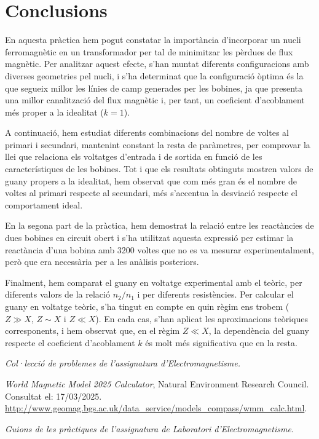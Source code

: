 \documentclass[a4paper,10.5pt]{report}
\begin{document}
\section{Conclusions}
En aquesta pràctica hem pogut constatar la importància d'incorporar un nucli ferromagnètic en un transformador per tal de minimitzar les pèrdues de flux magnètic. Per analitzar aquest efecte, s’han muntat diferents configuracions amb diverses geometries pel nucli, i s’ha determinat que la configuració òptima és la que segueix millor les línies de camp generades per les bobines, ja que presenta una millor canalització del flux magnètic i, per tant, un coeficient d’acoblament més proper a la idealitat ($k = 1$).

A continuació, hem estudiat diferents combinacions del nombre de voltes al primari i secundari, mantenint constant la resta de paràmetres, per comprovar la llei que relaciona els voltatges d'entrada i de sortida en funció de les característiques de les bobines. Tot i que els resultats obtinguts mostren valors de guany propers a la idealitat, hem observat que com més gran és el nombre de voltes al primari respecte al secundari, més s’accentua la desviació respecte el comportament ideal.

En la segona part de la pràctica, hem demostrat la relació entre les reactàncies de dues bobines en circuit obert i s’ha utilitzat aquesta expressió per estimar la reactància d’una bobina amb 3200 voltes que no es va mesurar experimentalment, però que era necessària per a les anàlisis posteriors.

Finalment, hem comparat el guany en voltatge experimental amb el teòric, per diferents valors de la relació $n_2/n_1$ i per diferents resistències. Per calcular el guany en voltatge teòric, s'ha tingut en compte en quin règim ens trobem ($Z \gg X$, $Z \sim X$ i $Z \ll X$). En cada cas, s’han aplicat les aproximacions teòriques corresponents, i hem observat que, en el règim $Z \ll X$, la dependència del guany respecte el coeficient d’acoblament $k$ és molt més significativa que en la resta.


\begin{thebibliography}{99}
	\textit{Col·lecció de problemes de l'assignatura d'Electromagnetisme.}
	
	\textit{World Magnetic Model 2025 Calculator}, Natural Environment Research Council. Consultat el: 17/03/2025.\\ 
	\url{http://www.geomag.bgs.ac.uk/data_service/models_compass/wmm_calc.html}.
	
	\textit{Guions de les pràctiques de l'assignatura de Laboratori d'Electromagnetisme}.
\end{thebibliography}
\end{document}
